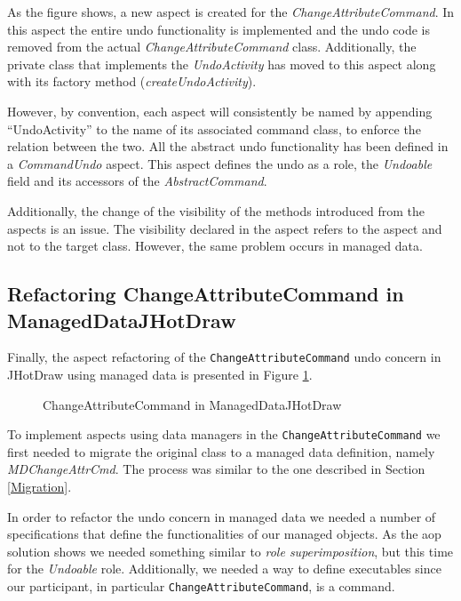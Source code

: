 As the figure shows, a new aspect is created for the \textit{ChangeAttributeCommand}.
In this aspect the entire undo functionality is implemented and the undo code is removed from the actual \textit{ChangeAttributeCommand} class. 
Additionally, the private class that implements the \textit{UndoActivity} has moved to this aspect along with its factory method (\textit{createUndoActivity}).

However, by convention, each aspect will consistently be named by appending ``UndoActivity'' to the name of its associated command class, to enforce the relation between the two.
All the abstract undo functionality has been defined in a \textit{CommandUndo} aspect.
This aspect defines the undo as a role, the \textit{Undoable} field and its accessors of the \textit{AbstractCommand}.

Additionally, the change of the visibility of the methods introduced from the aspects is an issue.
The visibility declared in the aspect refers to the aspect and not to the target class. 
However, the same problem occurs in managed data.

\subsection{Refactoring ChangeAttributeCommand in ManagedDataJHotDraw}
Finally, the aspect refactoring of the \texttt{ChangeAttributeCommand} undo concern in JHotDraw using managed data is presented in Figure \ref{fig:JHotDraw_Undo_Command_ChangeAttributeCommand_MD}.

\begin{figure} [H]
	\centering
  	\caption{ChangeAttributeCommand in ManagedDataJHotDraw}
  	\label{fig:JHotDraw_Undo_Command_ChangeAttributeCommand_MD}
\end{figure}

To implement aspects using data managers in the \texttt{ChangeAttributeCommand} we first needed to migrate the original class to a managed data definition, namely \textit{MDChangeAttrCmd}.
The process was similar to the one described in Section \ref{Migration}.

In order to refactor the undo concern in managed data we needed a number of specifications that define the functionalities of our managed objects.
As the \ac{aop} solution shows we needed something similar to \textit{role superimposition}, but this time for the \textit{Undoable} role.
Additionally, we needed a way to define executables since our participant, in particular \texttt{ChangeAttributeCommand}, is a command.


